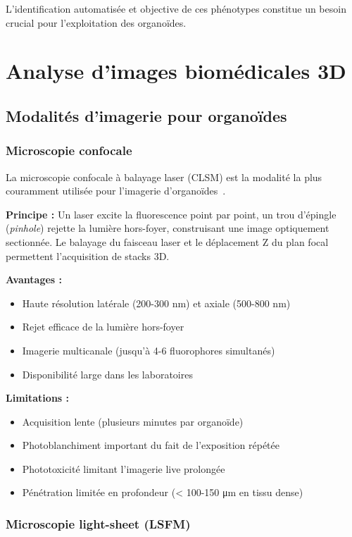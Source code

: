 L'identification automatisée et objective de ces phénotypes constitue un besoin crucial pour l'exploitation des organoïdes.

\section{Analyse d'images biomédicales 3D}

\subsection{Modalités d'imagerie pour organoïdes}

\subsubsection{Microscopie confocale}

La microscopie confocale à balayage laser (CLSM) est la modalité la plus couramment utilisée pour l'imagerie d'organoïdes~\cite{Litjens2017}.

\textbf{Principe :}
Un laser excite la fluorescence point par point, un trou d'épingle (\textit{pinhole}) rejette la lumière hors-foyer, construisant une image optiquement sectionnée. Le balayage du faisceau laser et le déplacement Z du plan focal permettent l'acquisition de stacks 3D.

\textbf{Avantages :}
\begin{itemize}
    \item Haute résolution latérale (200-300 nm) et axiale (500-800 nm)
    \item Rejet efficace de la lumière hors-foyer
    \item Imagerie multicanale (jusqu'à 4-6 fluorophores simultanés)
    \item Disponibilité large dans les laboratoires
\end{itemize}

\textbf{Limitations :}
\begin{itemize}
    \item Acquisition lente (plusieurs minutes par organoïde)
    \item Photoblanchiment important du fait de l'exposition répétée
    \item Phototoxicité limitant l'imagerie live prolongée
    \item Pénétration limitée en profondeur (< 100-150 μm en tissu dense)
\end{itemize}

\subsubsection{Microscopie light-sheet (LSFM)}

